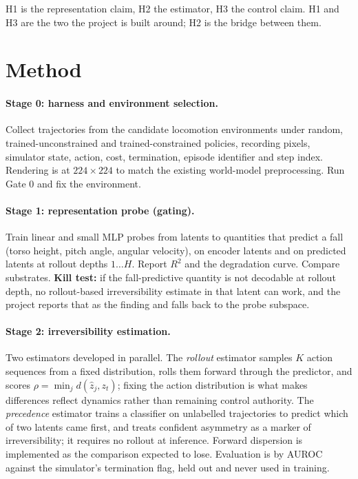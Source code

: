 \documentclass[11pt,a4paper]{article}
\begin{document}
H1 is the representation claim, H2 the estimator, H3 the control claim. H1 and H3 are the
two the project is built around; H2 is the bridge between them.

\section{Method}

\paragraph{Stage 0: harness and environment selection.} Collect trajectories from the
candidate locomotion environments under random, trained-unconstrained and
trained-constrained policies, recording pixels, simulator state, action, cost, termination,
episode identifier and step index. Rendering is at $224 \times 224$ to match the existing
world-model preprocessing. Run Gate 0 and fix the environment.

\paragraph{Stage 1: representation probe (gating).} Train linear and small MLP probes from
latents to quantities that predict a fall (torso height, pitch angle, angular velocity), on
encoder latents and on predicted latents at rollout depths $1 \ldots H$. Report $R^2$ and the
degradation curve. Compare substrates. \textbf{Kill test:} if the fall-predictive quantity is
not decodable at rollout depth, no rollout-based irreversibility estimate in that latent can
work, and the project reports that as the finding and falls back to the probe subspace.

\paragraph{Stage 2: irreversibility estimation.} Two estimators developed in parallel. The
\emph{rollout} estimator samples $K$ action sequences from a fixed distribution, rolls them
forward through the predictor, and scores $\rho = \min_j d(\hat{z}_j, z_t)$; fixing the action
distribution is what makes differences reflect dynamics rather than remaining control
authority. The \emph{precedence} estimator \parencite{grinsztajn2021turning} trains a
classifier on unlabelled trajectories to predict which of two latents came first, and treats
confident asymmetry as a marker of irreversibility; it requires no rollout at inference.
Forward dispersion is implemented as the comparison expected to lose. Evaluation is by AUROC
against the simulator's termination flag, held out and never used in training.
\end{document}
